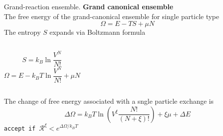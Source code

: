 \documentclass[10pt]{beamer}
\begin{document}
{
\begin{frame}{Grand-reaction ensemble.}
	\textbf{Grand canonical ensemble}\\ 
	\vspace{1cm}
	The free energy of the grand-canonical ensemble for single particle type
	\begin{equation*}
		\boxed{
		\Omega=E-TS+\mu N\label{eq:Omega-GC}}
	\end{equation*}
	The entropy $S$ expands via Boltzmann formula
	\begin{columns}[T,onlytextwidth]%
			\begin{equation*}
				S=k_{B}\ln\frac{V^{N}}{N!}\label{eq:entropy}
			\end{equation*}
			\begin{equation*}
				\Omega=E-k_BT\ln\frac{V^N}{N!}+\mu N \label{eq: Omega_GC}
			\end{equation*}
	\end{columns} %
	The change of free energy associated with a sngle particle exchange is 
	\begin{equation*}
		\boxed{
		\Delta\Omega=k_BT\ln\left(V^{\xi}\frac{N!}{\left(N+\xi\right)!}\right)+\xi\mu+\Delta E\label{eq: DeltaG GC}}
	\end{equation*}
	{\tt accept if $\mathcal{R}^{\xi}<e^{\Delta\Omega/k_BT}$}
\end{frame}
}
\end{document}
